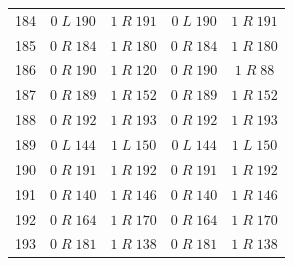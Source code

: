 \begin{longtable}{rcccc}
184 & $0\;L\;190$ & $1\;R\;191$ & $0\;L\;190$ & $1\;R\;191$\\
185 & $0\;R\;184$ & $1\;R\;180$ & $0\;R\;184$ & $1\;R\;180$\\
186 & $0\;R\;190$ & $1\;R\;120$ & $0\;R\;190$ & $1\;R\;88$\\
187 & $0\;R\;189$ & $1\;R\;152$ & $0\;R\;189$ & $1\;R\;152$\\
188 & $0\;R\;192$ & $1\;R\;193$ & $0\;R\;192$ & $1\;R\;193$\\
189 & $0\;L\;144$ & $1\;L\;150$ & $0\;L\;144$ & $1\;L\;150$\\
190 & $0\;R\;191$ & $1\;R\;192$ & $0\;R\;191$ & $1\;R\;192$\\
191 & $0\;R\;140$ & $1\;R\;146$ & $0\;R\;140$ & $1\;R\;146$\\
192 & $0\;R\;164$ & $1\;R\;170$ & $0\;R\;164$ & $1\;R\;170$\\
193 & $0\;R\;181$ & $1\;R\;138$ & $0\;R\;181$ & $1\;R\;138$\\
\bottomrule\end{longtable}
\endgroup
